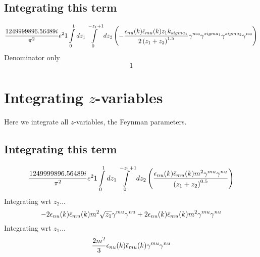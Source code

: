 \subsection*{Integrating this term}
\begin{dmath}\frac{1249999896.56489 i}{\pi^{2}} e^{2}1\int\limits_{ 0 }^{ 1 } d{ z_{ 1 } }\int\limits_{ 0 }^{ - { z_{ 1 } } + 1 } d{ z_{ 2 } }\left(- \frac{\epsilon_{ \\nu }({ k }) \bar{\epsilon}_{ \\mu }({ k }) { z_{ 1 } } { { k }_{ \\sigma_1 } }}{2 \left({ z_{ 1 } } + { z_{ 2 } }\right)^{1.5}} { \gamma^{ \\mu } } { \gamma^{ \\sigma_1 } } { \gamma^{ \\sigma_2 } } { \gamma^{ \\nu } }\right)\end{dmath}
Denominator only
\begin{dmath}1\end{dmath}
\section*{Integrating $z$-variables}
Here we integrate all $z$-variables, the Feynman parameters.
\subsection*{Integrating this term}
\begin{dmath}\frac{1249999896.56489 i}{\pi^{2}} e^{2}1\int\limits_{ 0 }^{ 1 } d{ z_{ 1 } }\int\limits_{ 0 }^{ - { z_{ 1 } } + 1 } d{ z_{ 2 } }\left(\frac{\epsilon_{ \\nu }({ k }) \bar{\epsilon}_{ \\mu }({ k }) m^{2} { \gamma^{ \\mu } } { \gamma^{ \\nu } }}{\left({ z_{ 1 } } + { z_{ 2 } }\right)^{0.5}}\right)\end{dmath}
Integrating wrt ${ z_{ 2 } }$...
\begin{dmath}- 2 \epsilon_{ \\nu }({ k }) \bar{\epsilon}_{ \\mu }({ k }) m^{2} \sqrt{{ z_{ 1 } }} { \gamma^{ \\mu } } { \gamma^{ \\nu } } + 2 \epsilon_{ \\nu }({ k }) \bar{\epsilon}_{ \\mu }({ k }) m^{2} { \gamma^{ \\mu } } { \gamma^{ \\nu } }\end{dmath}
Integrating wrt ${ z_{ 1 } }$...
\begin{dmath}\frac{2 m^{2}}{3} \epsilon_{ \\nu }({ k }) \bar{\epsilon}_{ \\mu }({ k }) { \gamma^{ \\mu } } { \gamma^{ \\nu } }\end{dmath}
